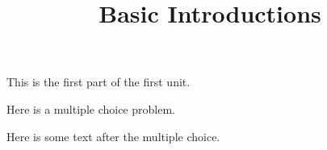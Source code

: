 \documentclass{ximera}
\title{Basic Introductions}
\begin{document}
This is the first part of the first unit.

\begin{exercise}
  Here is a multiple choice problem.
  \begin{solution}
    \begin{multiple-choice}
    \end{multiple-choice}
  \end{solution}

  Here is some text after the multiple choice.
\end{exercise}
\end{document}
